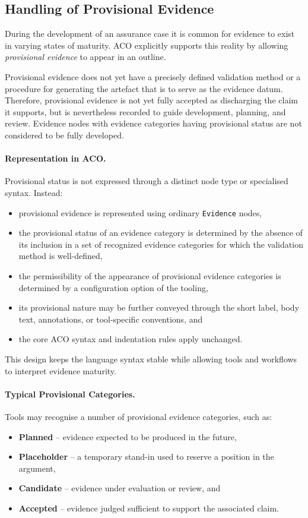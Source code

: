 \documentclass[11pt]{article}
\begin{document}
\subsection{Handling of Provisional Evidence}
\label{sec:provisional-evidence}

During the development of an assurance case it is common for evidence to exist in
varying states of maturity. ACO explicitly supports this reality by allowing
\emph{provisional evidence} to appear in an outline.

Provisional evidence does not yet have a precisely defined validation method or a procedure for generating the artefact that is to serve as the evidence datum.
Therefore, provisional evidence is not yet fully accepted as discharging
the claim it supports, but is nevertheless recorded to guide development,
planning, and review. Evidence nodes with evidence categories having provisional status are not considered to be fully developed.

\paragraph{Representation in ACO.}
Provisional status is not expressed through a distinct node type or specialised
syntax. Instead:
\begin{itemize}[leftmargin=2em]
  \item provisional evidence is represented using ordinary \texttt{Evidence} nodes,
  \item the provisional status of an evidence category is determined by the absence of its inclusion in a set of recognized evidence categories for which the validation method is well-defined,
  \item the permissibility of the appearance of provisional evidence categories is determined by a configuration option of the tooling,
  \item its provisional nature may be further conveyed through the short label, body text,
        annotations, or tool-specific conventions, and
  \item the core ACO syntax and indentation rules apply unchanged.
\end{itemize}

This design keeps the language syntax stable while allowing tools and workflows
to interpret evidence maturity.

\paragraph{Typical Provisional Categories.}
Tools may recognise a number of provisional evidence categories, such as:
\begin{itemize}[leftmargin=2em]
  \item \textbf{Planned} -- evidence expected to be produced in the future,
  \item \textbf{Placeholder} -- a temporary stand-in used to reserve a position in the argument,
  \item \textbf{Candidate} -- evidence under evaluation or review, and
  \item \textbf{Accepted} -- evidence judged sufficient to support the associated claim.
\end{itemize}
\end{document}
